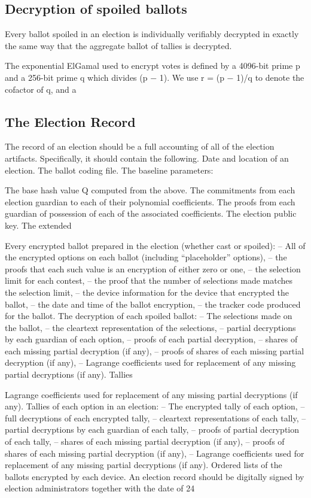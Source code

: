 \subsection{Decryption of spoiled ballots}
Every ballot spoiled in an election is individually verifiably decrypted in exactly the same way that the aggregate
ballot of tallies is decrypted.
\cite[21]{eg-spec}

The exponential ElGamal used to encrypt votes is defined by a 4096-bit prime p and a 256-bit prime q which divides (p −
1). We use r = (p − 1)/q to denote the cofactor of q, and a
\cite[21]{eg-spec}

\subsection{The Election Record}
The record of an election should be a full accounting of all of the election artifacts. Specifically, it should contain
the following. Date and location of an election. The ballot coding file. The baseline parameters:
\cite[24]{eg-spec}

The base hash value Q computed from the above. The commitments from each election guardian to each of their polynomial
coefficients. The proofs from each guardian of possession of each of the associated coefficients. The election public
key. The extended
\cite[24]{eg-spec}

Every encrypted ballot prepared in the election (whether cast or spoiled): – All of the encrypted options on each ballot
(including “placeholder” options), – the proofs that each such value is an encryption of either zero or one, – the
selection limit for each contest, – the proof that the number of selections made matches the selection limit, – the
device information for the device that encrypted the ballot, – the date and time of the ballot encryption, – the tracker
code produced for the ballot. The decryption of each spoiled ballot: – The selections made on the ballot, – the
cleartext representation of the selections, – partial decryptions by each guardian of each option, – proofs of each
partial decryption, – shares of each missing partial decryption (if any), – proofs of shares of each missing partial
decryption (if any), – Lagrange coefficients used for replacement of any missing partial decryptions (if any). Tallies
\cite[24]{eg-spec}


Lagrange coefficients used for replacement of any missing partial decryptions (if any). Tallies of each option in an
election: – The encrypted tally of each option, – full decryptions of each encrypted tally, – cleartext representations
of each tally, – partial decryptions by each guardian of each tally, – proofs of partial decryption of each tally, –
shares of each missing partial decryption (if any), – proofs of shares of each missing partial decryption (if any), –
Lagrange coefficients used for replacement of any missing partial decryptions (if any). Ordered lists of the ballots
encrypted by each device. An election record should be digitally signed by election administrators together with the
date of 24
\cite[24]{eg-spec}


